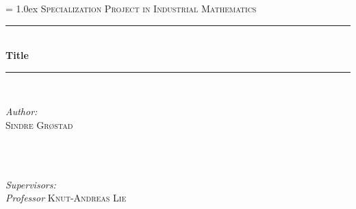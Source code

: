 \begin{titlepage}

\newcommand{\HRule}{\rule{\linewidth}{0.5mm}} %

\center %
 

\parindent=0.0cm
\parskip = 1.0ex
\vspace*{1.5cm}
\textsc{\Large Specialization Project in Industrial Mathematics}\\[0.5cm] %


\HRule \\[0.7cm]
{ \huge \bfseries Title}\\[0.4cm] %
\HRule \\[1.5cm]
 

\begin{minipage}{0.4\textwidth}
\begin{flushleft} \large
\emph{Author:} \\ 
\textsc{Sindre Grøstad} \\ %
\textsc{ } \\
\end{flushleft}
\end{minipage}
~
\begin{minipage}{0.5\textwidth}
\begin{flushright} \large
\emph{Supervisors:} \\
\emph{Professor} \textsc{Knut-Andreas Lie} \\%
\end{flushright}
\end{minipage}\\[4cm]
\vspace{5cm}


\end{titlepage}
